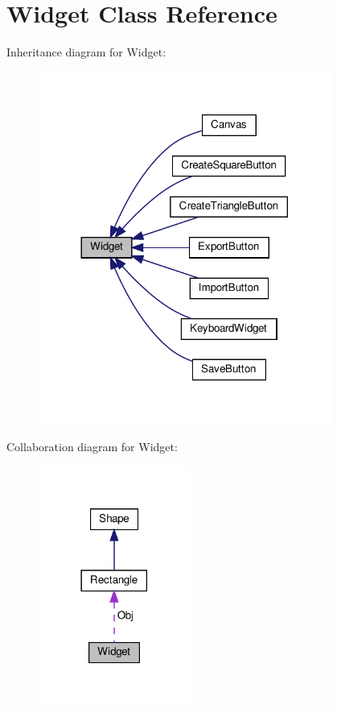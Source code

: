 \hypertarget{classWidget}{}\section{Widget Class Reference}
\label{classWidget}


Inheritance diagram for Widget\+:\nopagebreak
\begin{figure}[H]
\begin{center}
\leavevmode
\includegraphics[width=272pt]{classWidget__inherit__graph}
\end{center}
\end{figure}


Collaboration diagram for Widget\+:\nopagebreak
\begin{figure}[H]
\begin{center}
\leavevmode
\includegraphics[width=141pt]{classWidget__coll__graph}
\end{center}
\end{figure}
